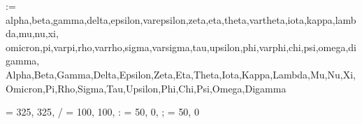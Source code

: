 \newcommand{\savesffamily}{\sfdefault}
\makeatletter
\newcommand{\savesfmdseries}{\mdseries@sf}
\newcommand{\savesfbfseries}{\bfseries@sf}
\makeatother

\usepackage[
	charter, greeklowercase = italicized, greekuppercase = italicized,
	sfscaled = false, ttscaled = false, euro = false
]{mathdesign}
\let \savermfamily   \rmdefault
\let \savermmdseries \mddefault
\let \savermbfseries \bfdefault

\makeatletter
\@for\@tempa:=%
	alpha,beta,gamma,delta,epsilon,varepsilon,zeta,eta,theta,vartheta,iota,kappa,lambda,mu,nu,xi,%
	omicron,pi,varpi,rho,varrho,sigma,varsigma,tau,upsilon,phi,varphi,chi,psi,omega,digamma,%
	Alpha,Beta,Gamma,Delta,Epsilon,Zeta,Eta,Theta,Iota,Kappa,Lambda,Mu,Nu,Xi,%
	Omicron,Pi,Rho,Sigma,Tau,Upsilon,Phi,Chi,Psi,Omega,Digamma%
	\do{%
		\expandafter\let\csname up\@tempa\expandafter\endcsname\csname\@tempa up\endcsname%
	}%
\makeatother

\ifx\nequiv\undefined
	\newcommand{\nequiv}{\not\equiv}
\fi

\usepackage[scaled = 0.96, lining]{XCharter}  %
\let \savermdefaultfortext \rmdefault
\let \savemddefaultfortext \mddefault
\let \savebfdefaultfortext \bfdefault
\renewcommand{\textellipsis}{\mbox{.{\kern.09em}.{\kern.09em}.}}
\makeatletter
\let \@makefnmarkorig \@makefnmark
\makeatother

\ifxetex
\else
		{\textemdash = {325, 325},
		           / = {100, 100},
		           : = { 50,   0},
		           ; = { 50,   0}}
\fi

\usepackage{xfrac}  %

\AtBeginDocument{%
	\providecommand{\euro}[1]{\relax\ifmmode\text{\texteuro}#1\else\texteuro #1\fi}%
}

